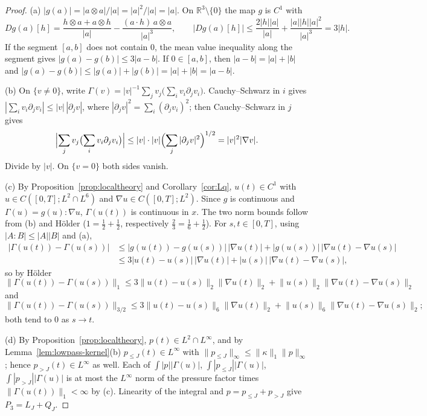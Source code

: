 \documentclass[11pt]{article}
\theoremstyle{definition}
\theoremstyle{plain}
\newcommand{\R}{\mathbb R}
\newcommand{\norm}[1]{\lVert #1\rVert}
\begin{document}
\begin{proof}
(a) $|g(a)|=|a\otimes a|/|a|=|a|^2/|a|=|a|$.  On $\R^3\setminus\{0\}$ the map
$g$ is $C^1$ with
\[
 Dg(a)[h]=\frac{h\otimes a+a\otimes h}{|a|}-\frac{(a\cdot h)\,a\otimes a}{|a|^3},
 \qquad |Dg(a)[h]|\le\frac{2|h||a|}{|a|}+\frac{|a||h||a|^2}{|a|^3}=3|h| .
\]
If the segment $[a,b]$ does not contain $0$, the mean value inequality
along the segment gives $|g(a)-g(b)|\le3|a-b|$.  If $0\in[a,b]$, then
$|a-b|=|a|+|b|$ and $|g(a)-g(b)|\le|g(a)|+|g(b)|=|a|+|b|=|a-b|$.

(b) On $\{v\ne0\}$, write $\Gamma(v)=|v|^{-1}\sum_jv_j\bigl(\sum_iv_i\partial_jv_i\bigr)$.
Cauchy--Schwarz in $i$ gives $|\sum_iv_i\partial_jv_i|\le|v|\,|\partial_jv|$,
where $|\partial_jv|^2=\sum_i(\partial_jv_i)^2$; then Cauchy--Schwarz in
$j$ gives
\[
 \Bigl|\sum_jv_j\bigl(\sum_iv_i\partial_jv_i\bigr)\Bigr|
 \le|v|\cdot|v|\Bigl(\sum_j|\partial_jv|^2\Bigr)^{1/2}=|v|^2|\nabla v| .
\]
Divide by $|v|$.  On $\{v=0\}$ both sides vanish.

(c) By Proposition~\ref{prop:localtheory} and Corollary~\ref{cor:Lq},
$u(t)\in C^1$ with
$u\in C([0,T];L^2\cap L^6)$ and $\nabla u\in C([0,T];L^2)$.  Since
$g$ is continuous and $\Gamma(u)=g(u):\nabla u$, $\Gamma(u(t))$ is continuous
in $x$.  The two norm bounds follow from (b) and H\"older
($1=\tfrac12+\tfrac12$, respectively $\tfrac23=\tfrac16+\tfrac12$).  For
$s,t\in[0,T]$, using $|A:B|\le|A||B|$ and (a),
\[
\begin{aligned}
 \bigl|\Gamma(u(t))-\Gamma(u(s))\bigr|
 &\le\bigl|g(u(t))-g(u(s))\bigr|\,|\nabla u(t)|
   +|g(u(s))|\,|\nabla u(t)-\nabla u(s)|\\
 &\le3|u(t)-u(s)|\,|\nabla u(t)|+|u(s)|\,|\nabla u(t)-\nabla u(s)| ,
\end{aligned}
\]
so by H\"older
\[
 \norm{\Gamma(u(t))-\Gamma(u(s))}_1
 \le3\norm{u(t)-u(s)}_2\norm{\nabla u(t)}_2
 +\norm{u(s)}_2\norm{\nabla u(t)-\nabla u(s)}_2
\]
and
\[
 \norm{\Gamma(u(t))-\Gamma(u(s))}_{3/2}
 \le3\norm{u(t)-u(s)}_6\norm{\nabla u(t)}_2
 +\norm{u(s)}_6\norm{\nabla u(t)-\nabla u(s)}_2 ;
\]
both tend to $0$ as $s\to t$.

(d) By Proposition~\ref{prop:localtheory}, $p(t)\in L^2\cap L^\infty$, and by
Lemma~\ref{lem:lowpass-kernel}(b) $p_{\le J}(t)\in L^\infty$ with
$\norm{p_{\le J}}_\infty\le\norm\kappa_1\norm p_\infty$; hence
$p_{>J}(t)\in L^\infty$ as well.  Each of $\int|p||\Gamma(u)|$,
$\int|p_{\le J}||\Gamma(u)|$, $\int|p_{>J}||\Gamma(u)|$ is at most the
$L^\infty$ norm of the pressure factor times $\norm{\Gamma(u(t))}_1<\infty$ by
(c).  Linearity of the integral and $p=p_{\le J}+p_{>J}$ give $P_3=L_J+Q_J$.
\end{proof}
\end{document}
